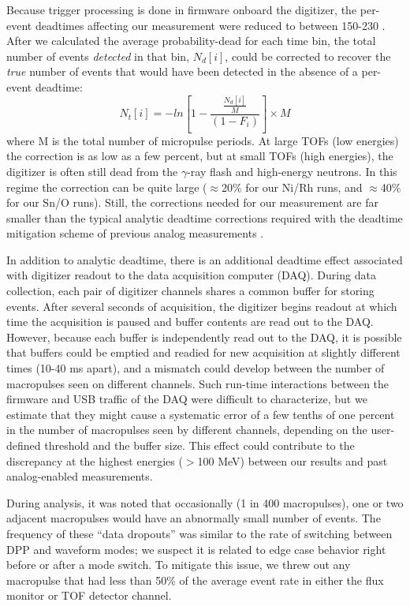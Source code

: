 \documentclass[twocolumn,secnumarabic,amssymb, nobibnotes, aps, prl,
superscriptaddress, nobalancelastpage]{revtex4}
\begin{document}
Because trigger processing is done in firmware onboard the digitizer,
the per-event deadtimes affecting our
measurement were reduced to between 150-230 \nano\second.
After we calculated the average probability-dead for each time bin,
the total number of events \textit{detected} in that bin, $N_{d}[i]$, could be
corrected to recover the \textit{true} number of events that would have been
detected in the absence of a per-event deadtime:
\begin{equation}
    N_{t}[i] = -ln\left[1-\frac{\frac{N_{d}[i]}{M}}{(1-F_{i})}\right]\times M
\end{equation}
where M is the total number of micropulse periods. At large TOFs (low energies) 
the correction is as low as a few percent,
but at small TOFs (high energies), the digitizer is often still dead
from the $\gamma$-ray flash and high-energy neutrons. In this regime
the correction can be quite large ($\approx$20\% for our Ni/Rh runs,
and $\approx$40\% for our Sn/O runs). Still, the corrections needed for our measurement
are far smaller than the typical analytic deadtime corrections required
with the deadtime mitigation scheme of previous analog measurements \cite{Finlay1993,
Abfalterer2001}.

In addition to analytic deadtime, there is an additional deadtime effect associated with 
digitizer readout to the data acquisition computer (DAQ). During data
collection, each pair of digitizer channels shares a common buffer for storing events.
After several seconds of acquisition, the digitizer begins readout at which time the
acquisition is paused and buffer contents are read out to the DAQ. However,
because each buffer is independently read out to the DAQ, it is possible that buffers
could be emptied and readied for new acquisition at slightly different times
(10-40 ms apart), and a mismatch could develop between the number of macropulses
seen on different channels. Such run-time interactions between the firmware and USB
traffic of the DAQ were difficult to characterize, but we estimate that they might cause a 
systematic error of a few tenths of one percent in the number of macropulses seen
by different channels, depending on the user-defined 
threshold and the buffer size. This effect could contribute to the discrepancy at the
highest energies ($>$100 MeV) between our results and past analog-enabled
measurements.

During analysis, it was noted that occasionally (1 in 400 macropulses), one or two 
adjacent macropulses would have an abnormally small number of events. The frequency
of these ``data dropouts'' was similar to the rate of
switching between DPP and waveform modes; we suspect it is related to edge
case behavior right before or after a mode switch. To mitigate this issue,
we threw out any macropulse that had less than 50\% of the average event rate in either the
flux monitor or TOF detector channel.
\end{document}
